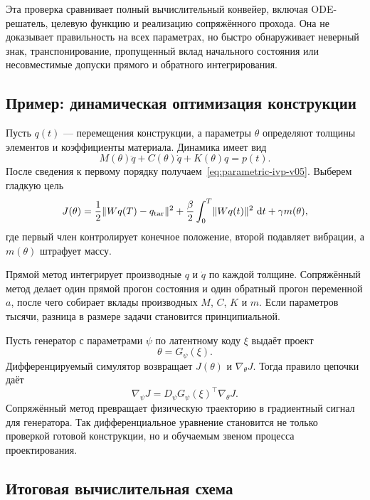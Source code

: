Эта проверка сравнивает полный вычислительный конвейер, включая ODE-решатель, целевую функцию и реализацию сопряжённого прохода. Она не доказывает правильность на всех параметрах, но быстро обнаруживает неверный знак, транспонирование, пропущенный вклад начального состояния или несовместимые допуски прямого и обратного интегрирования.

\subsection{Пример: динамическая оптимизация конструкции}

Пусть $q(t)$ --- перемещения конструкции, а параметры $\theta$ определяют толщины элементов и коэффициенты материала. Динамика имеет вид
\[
M(\theta)\ddot q+C(\theta)\dot q+K(\theta)q=p(t).
\]
После сведения к первому порядку получаем~\eqref{eq:parametric-ivp-v05}. Выберем гладкую цель
\begin{equation}
\label{eq:structural-dynamic-objective-v05}
J(\theta)
=
\frac12\lVert Wq(T)-q_{\mathrm{tar}}\rVert^2
+
\frac\beta2\int_0^T\lVert Wq(t)\rVert^2\,\mathop{}\!\mathrm{d} t
+
\gamma m(\theta),
\end{equation}
где первый член контролирует конечное положение, второй подавляет вибрации, а $m(\theta)$ штрафует массу.

Прямой метод интегрирует производные $q$ и $\dot q$ по каждой толщине. Сопряжённый метод делает один прямой прогон состояния и один обратный прогон переменной $a$, после чего собирает вклады производных $M$, $C$, $K$ и $m$. Если параметров тысячи, разница в размере задачи становится принципиальной.

\begin{application}
Пусть генератор с параметрами $\psi$ по латентному коду $\xi$ выдаёт проект
\[
\theta=G_\psi(\xi).
\]
Дифференцируемый симулятор возвращает $J(\theta)$ и $\nabla_\theta J$. Тогда правило цепочки даёт
\begin{equation}
\label{eq:generator-through-simulator-v05}
\nabla_\psi J
=
D_\psi G_\psi(\xi)^\top
\nabla_\theta J.
\end{equation}
Сопряжённый метод превращает физическую траекторию в градиентный сигнал для генератора. Так дифференциальное уравнение становится не только проверкой готовой конструкции, но и обучаемым звеном процесса проектирования.
\end{application}

\subsection{Итоговая вычислительная схема}

